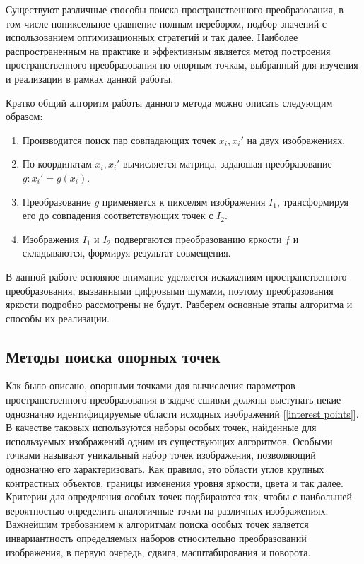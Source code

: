 {{   Существуют различные способы поиска пространственного преобразования, в том числе попиксельное сравнение полным перебором, подбор значений с использованием оптимизационных стратегий и так далее. Наиболее распространенным на практике и эффективным является метод построения пространственного преобразования по опорным точкам, выбранный для изучения и реализации в рамках данной работы. 
   
   Кратко общий алгоритм работы данного метода можно описать следующим образом:
   \begin{enumerate}
   	\item Производится поиск пар совпадающих точек $x_i, x_i'$ на двух изображениях.
   	\item По координатам $x_i, x_i'$ вычисляется матрица, задаюшая преобразование $g: x_i' = g(x_i)$.
   	\item Преобразование $g$ применяется к пикселям изображения $I_1$, трансформируя его до совпадения соответствующих точек с $I_2$.
   	\item Изображения $I_1$ и $I_2$ подвергаются преобразованию яркости $f$ и складываются, формируя результат совмещения.
   \end{enumerate} 

	 В данной работе основное внимание уделяется искажениям пространственного преобразования, вызванными цифровыми шумами, поэтому преобразования яркости подробно рассмотрены не будут. 
	 Разберем основные этапы алгоритма и способы их реализации.
}
\subsection{Методы поиска опорных точек}{
	Как было описано, опорными точками для вычисления параметров пространственного преобразования в задаче сшивки должны выступать некие однозначно идентифицируемые области исходных изображений [\ref{interest points}]. В качестве таковых используются наборы особых точек, найденные для используемых изображений одним из существующих алгоритмов.
	Особыми точками называют уникальный набор точек изображения, позволяющий однозначно его характеризовать. Как правило, это области углов крупных контрастных объектов, границы изменения уровня яркости, цвета и так далее. Критерии для определения особых точек подбираются так, чтобы с наибольшей вероятностью определить аналогичные точки на различных изображениях.
	Важнейшим требованием к алгоритмам поиска особых точек является инвариантность определяемых наборов относительно преобразований изображения, в первую очередь, сдвига, масштабирования и поворота.
	
}}
